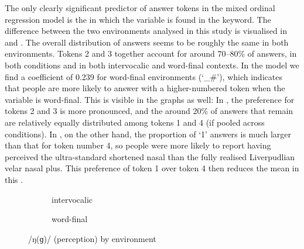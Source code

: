 The only clearly significant predictor of answer tokens in the mixed ordinal regression model is the  in which the variable is found in the keyword.
The difference between the two environments analysed in this study is visualised in  and .
The overall distribution of answers seems to be roughly the same in both environments.
Tokens 2 and 3 together account for around 70--80\% of answers, in both  conditions and in both intervocalic and word-final contexts.
In the model we find a coefficient of 0.239 for word-final environments (`\_\#'), which indicates that people are more likely to answer with a higher-numbered token when the variable is word-final.
This is visible in the graphs as well: In , the preference for tokens 2 and 3 is more pronounced, and the around 20\% of answers that remain are relatively equally distributed among tokens 1 and 4 (if pooled across  conditions).
In , on the other hand, the proportion of `1' answers is much larger than that for token number 4, so people were more likely to report having perceived the ultra-standard shortened nasal than the fully realised Liverpudlian velar nasal plus.
This preference of token 1 over token 4 then reduces the mean in this .

\begin{figure}[t]
	
	\begin{subfigure}{0.49\textwidth}
		
			\resizebox{\linewidth}{!}{}
		\caption{intervocalic}
		\label{fig.bar.ng.ext.intervoc}
	\end{subfigure}
	\begin{subfigure}{0.49\textwidth}
		
			\resizebox{\linewidth}{!}{} 
		\caption{word-final}
		\label{fig.bar.ng.ext.wordfinal}
	\end{subfigure}
	\caption{/ŋ(ɡ)/ (perception) by environment}
	\label{fig.bar.ng.ext.environment}
\end{figure}


